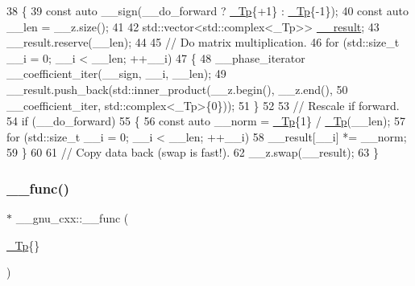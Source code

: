 \begin{DoxyCode}
38     \{
39       \textcolor{keyword}{const} \textcolor{keyword}{auto} \_\_sign(\_\_do\_forward ? \hyperlink{namespace____gnu__cxx_a3b19a9c800ca194374ef9172290f7d79}{\_Tp}\{+1\} : \hyperlink{namespace____gnu__cxx_a3b19a9c800ca194374ef9172290f7d79}{\_Tp}\{-1\});
40       \textcolor{keyword}{const} \textcolor{keyword}{auto} \_\_len = \_\_z.size();
41 
42       std::vector<std::complex<\_Tp>> \hyperlink{namespace____gnu__cxx_a500ea9f53aeaecd8c2ae657503450578}{\_\_result};
43       \_\_result.reserve(\_\_len);
44 
45       \textcolor{comment}{// Do matrix multiplication.}
46       \textcolor{keywordflow}{for} (std::size\_t \_\_i = 0; \_\_i < \_\_len; ++\_\_i)
47         \{
48           \_\_phase\_iterator \_\_coefficient\_iter(\_\_sign, \_\_i, \_\_len);
49           \_\_result.push\_back(std::inner\_product(\_\_z.begin(), \_\_z.end(),
50                              \_\_coefficient\_iter, std::complex<\_Tp>\{0\}));
51         \}
52 
53       \textcolor{comment}{// Rescale if forward.}
54       \textcolor{keywordflow}{if} (\_\_do\_forward)
55         \{
56           \textcolor{keyword}{const} \textcolor{keyword}{auto} \_\_norm = \hyperlink{namespace____gnu__cxx_a3b19a9c800ca194374ef9172290f7d79}{\_Tp}\{1\} / \hyperlink{namespace____gnu__cxx_a3b19a9c800ca194374ef9172290f7d79}{\_Tp}(\_\_len);
57           \textcolor{keywordflow}{for} (std::size\_t \_\_i = 0; \_\_i < \_\_len; ++\_\_i)
58             \_\_result[\_\_i] *= \_\_norm;
59         \}
60 
61       \textcolor{comment}{// Copy data back (swap is fast!).}
62       \_\_z.swap(\_\_result);
63     \}
\end{DoxyCode}
\mbox{\label{namespace____gnu__cxx_af2b2f0c7a2ae72b922b1afefae5a65b2}} 
\subsubsection{\texorpdfstring{\+\_\+\+\_\+func()}{\_\_func()}}
{\footnotesize\ttfamily $\ast$ \+\_\+\+\_\+gnu\+\_\+cxx\+::\+\_\+\+\_\+func (\begin{DoxyParamCaption}\item[{\hyperlink{namespace____gnu__cxx_a3b19a9c800ca194374ef9172290f7d79}{\+\_\+\+Tp}\{\}}]{ }\end{DoxyParamCaption})}




